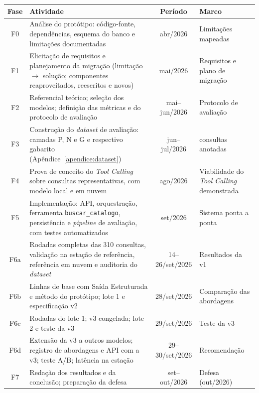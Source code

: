 \begin{quadro}[h]
\centering
\caption{Cronograma de execução do projeto}
\label{quadro:cronograma}
\small
\begin{tabular}{|c|>{\raggedright\arraybackslash}p{6.6cm}|c|>{\raggedright\arraybackslash}p{3.4cm}|}
\hline
\textbf{Fase} & \textbf{Atividade} & \textbf{Período} & \textbf{Marco} \\
\hline
F0 & Análise do protótipo: código-fonte, dependências, esquema do banco e limitações documentadas & abr/2026 & Limitações mapeadas \\
\hline
F1 & Elicitação de requisitos e planejamento da migração (limitação $\to$ solução; componentes reaproveitados, reescritos e novos) & mai/2026 & Requisitos e plano de migração \\
\hline
F2 & Referencial teórico; seleção dos modelos; definição das métricas e do protocolo de avaliação & mai--jun/2026 & Protocolo de avaliação \\
\hline
F3 & Construção do \textit{dataset} de avaliação: camadas P, N e G e respectivo gabarito (Apêndice~\ref{apendice:dataset}) & jun--jul/2026 & 310 consultas anotadas \\
\hline
F4 & Prova de conceito do \textit{Tool Calling} sobre consultas representativas, com modelo local e em nuvem & ago/2026 & Viabilidade do \textit{Tool Calling} demonstrada \\
\hline
F5 & Implementação: API, orquestração, ferramenta \texttt{buscar\_catalogo}, persistência e \textit{pipeline} de avaliação, com testes automatizados & set/2026 & Sistema ponta a ponta \\
\hline
F6a & Rodadas completas das 310 consultas, validação na estação de referência, referência em nuvem e auditoria do \textit{dataset} & 14--26/set/2026 & Resultados da v1 \\
\hline
F6b & Linhas de base com Saída Estruturada e método do protótipo; lote 1 e especificação v2 & 28/set/2026 & Comparação das abordagens \\
\hline
F6c & Rodadas do lote 1; v3 congelada; lote 2 e teste da v3 & 29/set/2026 & Teste da v3 \\
\hline
F6d & Extensão da v3 a outros modelos; registro de abordagens e API com a v3; teste A/B; latência na estação & 29--30/set/2026 & Recomendação \\
\hline
F7 & Redação dos resultados e da conclusão; preparação da defesa & set--out/2026 & Defesa (out/2026) \\
\hline
\end{tabular}%
\end{quadro}
